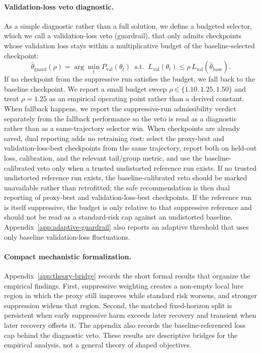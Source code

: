 \paragraph{Validation-loss veto diagnostic.}
As a simple diagnostic rather than a full solution, we define a budgeted selector, which we call a validation-loss veto (guardrail), that only admits checkpoints whose validation loss stays within a multiplicative budget of the baseline-selected checkpoint:
\begin{equation}
\hat{\theta}_{\mathrm{guard}}(\rho)=
\arg\min_t P_{\mathrm{val}}(\theta_t)
\;\;\text{s.t.}\;\;
L_{\mathrm{val}}(\theta_t) \le \rho \, L_{\mathrm{val}}(\hat{\theta}_{\mathrm{base}}).
\label{eq:guardrail}
\end{equation}
If no checkpoint from the suppressive run satisfies the budget, we fall back to the baseline checkpoint.
We report a small budget sweep $\rho \in \{1.10,1.25,1.50\}$ and treat $\rho=1.25$ as an empirical operating point rather than a derived constant.
When fallback happens, we report the suppressive-run admissibility verdict separately from the fallback performance so the veto is read as a diagnostic rather than as a same-trajectory selector win.
When checkpoints are already saved, dual reporting adds no retraining cost: select the proxy-best and validation-loss-best checkpoints from the same trajectory, report both on held-out loss, calibration, and the relevant tail/group metric, and use the baseline-calibrated veto only when a trusted undistorted reference run exists.
If no trusted undistorted reference run exists, the baseline-calibrated veto should be marked unavailable rather than retrofitted; the safe recommendation is then dual reporting of proxy-best and validation-loss-best checkpoints.
If the reference run is itself suppressive, the budget is only relative to that suppressive reference and should not be read as a standard-risk cap against an undistorted baseline.
Appendix~\ref{app:adaptive-guardrail} also reports an adaptive threshold that uses only baseline validation-loss fluctuations.

\paragraph{Compact mechanistic formalization.}
Appendix~\ref{app:theory-bridge} records the short formal results that organize the empirical findings.
First, suppressive weighting creates a non-empty local lure region in which the proxy still improves while standard risk worsens, and stronger suppression widens that region.
Second, the matched fixed-horizon split is persistent when early suppressive harm exceeds later recovery and transient when later recovery offsets it.
The appendix also records the baseline-referenced loss cap behind the diagnostic veto.
These results are descriptive bridges for the empirical analysis, not a general theory of shaped objectives.

